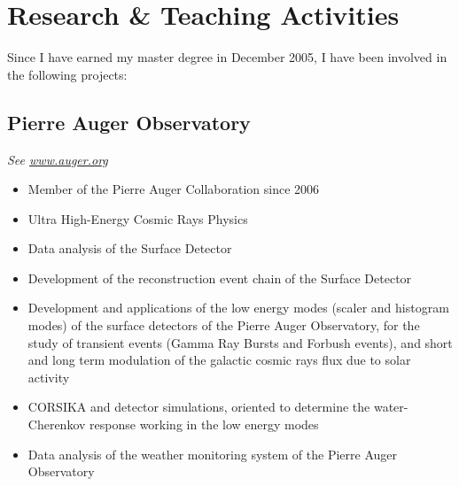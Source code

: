 \ifeng
\section*{Research \& Teaching Activities}

Since I have earned my master degree in December 2005, I have been involved in
the following projects:

\subsection*{Pierre Auger Observatory}

{\small{\textit{See \href{http://www.auger.org/}{www.auger.org}}}}
\begin{itemize}
\item Member of the Pierre Auger Collaboration since 2006
\item Ultra High-Energy Cosmic Rays Physics 
\item Data analysis of the Surface Detector
\item Development of the reconstruction event chain of the Surface Detector
\item Development and applications of the low energy modes (scaler and histogram
modes) of the surface detectors of the Pierre Auger Observatory, for the study
of transient events (Gamma Ray Bursts and Forbush events), and short and long
term modulation of the galactic cosmic rays flux due to solar activity
\item CORSIKA and detector simulations, oriented to determine the
water-Cherenkov response working in the low energy modes
\item Data analysis of the weather monitoring system of the Pierre Auger
Observatory
\end{itemize}

